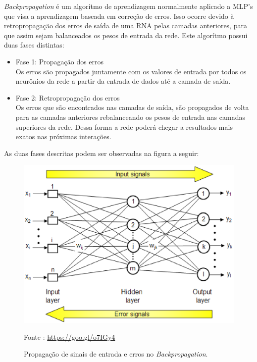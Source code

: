 \textit{Backpropagation} é um algorítmo de aprendizagem normalmente aplicado a MLP's que visa a aprendizagem baseada em correção de erros. Isso ocorre devido à retropropagação dos erros de saída de uma RNA pelas camadas anteriores, para que assim sejam balanceados os pesos de entrada da rede.
Este algorítmo possui duas fases distintas:

\begin{itemize}
    \item Fase 1: Propagação dos erros \\ Os erros são propagados juntamente com os valores de entrada por todos os neurônios da rede a partir da entrada de dados até a camada de saída.
    \item Fase 2: Retropropagação dos erros \\ Os erros que são encontrados nas camadas de saída, são propagados de volta para as camadas anteriores rebalanceando os pesos de entrada nas camadas superiores da rede. \cite{netto2006} Dessa forma a rede poderá chegar a resultados mais exatos nas próximas interações.
\end{itemize}

As duas fases descritas podem ser observadas na figura a seguir:

\begin{figure}[ht]
        \centering
        \label{fig05}
            \includegraphics[keepaspectratio=true, scale=0.4]{editaveis/images/backprop.eps}
        \caption{Propagação de sinais de entrada e erros no \textit{Backpropagation}.}
        Fonte : \url{https://goo.gl/o7IGy4}
\end{figure}

